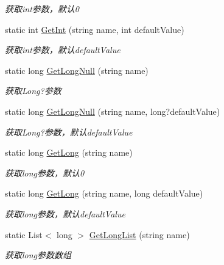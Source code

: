 \begin{DoxyCompactItemize}
\begin{DoxyCompactList}\small\item\em 获取int参数，默认0 \end{DoxyCompactList}\item 
static int \hyperlink{class_x_c_l_net_tools_1_1_string_hander_1_1_form_helper_ab1cbc4a5f6643c60beaf928081457b6f}{Get\-Int} (string name, int default\-Value)
\begin{DoxyCompactList}\small\item\em 获取int参数，默认default\-Value \end{DoxyCompactList}\item 
static long \hyperlink{class_x_c_l_net_tools_1_1_string_hander_1_1_form_helper_abffef0560d4655c00c5bdd3e4ff087cc}{Get\-Long\-Null} (string name)
\begin{DoxyCompactList}\small\item\em 获取\-Long?参数 \end{DoxyCompactList}\item 
static long \hyperlink{class_x_c_l_net_tools_1_1_string_hander_1_1_form_helper_a7e009fc6b804b15f2015d78ed3581677}{Get\-Long\-Null} (string name, long?default\-Value)
\begin{DoxyCompactList}\small\item\em 获取\-Long?参数，默认default\-Value \end{DoxyCompactList}\item 
static long \hyperlink{class_x_c_l_net_tools_1_1_string_hander_1_1_form_helper_a55353bd867fa827c8eb55a710df02cb1}{Get\-Long} (string name)
\begin{DoxyCompactList}\small\item\em 获取long参数，默认0 \end{DoxyCompactList}\item 
static long \hyperlink{class_x_c_l_net_tools_1_1_string_hander_1_1_form_helper_a51392713a245c7460bb5c823eb664ef8}{Get\-Long} (string name, long default\-Value)
\begin{DoxyCompactList}\small\item\em 获取long参数，默认default\-Value \end{DoxyCompactList}\item 
static List$<$ long $>$ \hyperlink{class_x_c_l_net_tools_1_1_string_hander_1_1_form_helper_ac00bef1db952ab0901c1813bbe193fa0}{Get\-Long\-List} (string name)
\begin{DoxyCompactList}\small\item\em 获取long参数数组 \end{DoxyCompactList}\item 

\end{DoxyCompactItemize}
